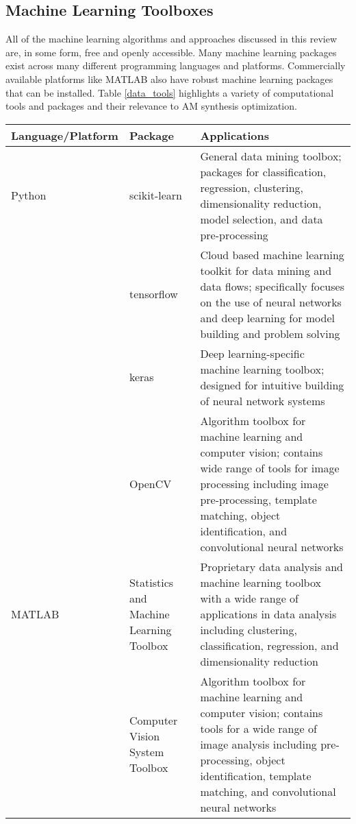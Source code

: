 \subsection{Machine Learning Toolboxes}
All of the machine learning algorithms and approaches discussed in this review are, in some form, free and openly accessible. Many machine learning packages exist across many different programming languages and platforms. Commercially available platforms like MATLAB also have robust machine learning packages that can be installed. Table \ref{data_tools} highlights a variety of computational tools and packages and their relevance to AM synthesis optimization. 

\begin{table*}
    \renewcommand{\arraystretch}{0.8}
    \setlength{\tabcolsep}{5pt}
    \begin{center}
        \begin{tabular}{p{3cm}|p{3.5cm}|p{11cm}}
            \toprule
            Language/Platform & Package & Applications  \\ \midrule 
            \hline
            \hline
            Python & scikit-learn & General data mining toolbox; packages for classification, regression, clustering, dimensionality reduction, model selection, and data pre-processing\\
            		& tensorflow & Cloud based machine learning toolkit for data mining and data flows; specifically focuses on the use of neural networks and deep learning for model building and problem solving\\
			& keras & Deep learning-specific machine learning toolbox; designed for intuitive building of neural network systems\\
			& OpenCV & Algorithm toolbox for machine learning and computer vision; contains wide range of tools for image processing including image pre-processing, template matching, object identification, and convolutional neural networks\\ \hline \hline
			
	   MATLAB & Statistics and Machine Learning Toolbox & Proprietary data analysis and machine learning toolbox with a wide range of applications in data analysis including clustering, classification, regression, and dimensionality reduction\\
	   		& Computer Vision System Toolbox & Algorithm toolbox for machine learning and computer vision; contains tools for a wide range of image analysis including pre-processing, object identification, template matching, and convolutional neural networks\\ \hline \hline
			

\end{tabular}
\end{center}
\end{table*}
